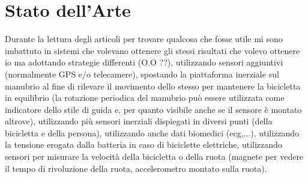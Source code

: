 \documentclass[class=article]{standalone}
\begin{document}
	\section{Stato dell'Arte}
	Durante la lettura degli articoli per trovare qualcosa che fosse utile mi sono imbattuto in sistemi che volevano ottenere gli stessi risultati che volevo ottenere io ma adottando strategie differenti (O.O ??), utilizzando sensori aggiuntivi (normalmente GPS e/o telecamere), spostando la piattaforma inerziale sul manubrio al fine di rilevare il movimento dello stesso per mantenere la bicicletta in equilibrio (la rotazione periodica del manubrio può essere utilizzata come indicatore dello stile di guida e, per quanto visibile anche se il sensore è montato altrove), utilizzando più sensori inerziali dispiegati in diversi punti (della bicicletta e della persona), utilizzando anche dati biomedici (ecg,...), utilizzando la tensione erogata dalla batteria in caso di biciclette elettriche, utilizzando sensori per misurare la velocità della bicicletta o della ruota (magnete per vedere il tempo di rivoluzione della ruota, accelerometro montato sulla ruota).
\end{document}
